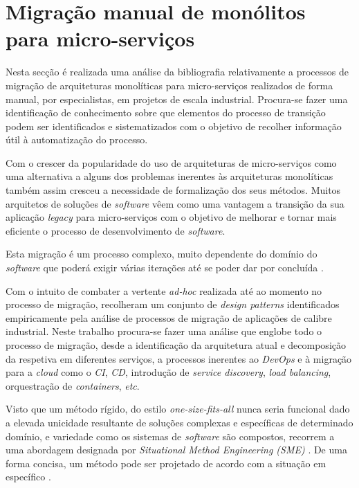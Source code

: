 \section{Migração manual de monólitos para micro-serviços}

   Nesta secção é realizada uma análise da bibliografia relativamente a processos de migração de arquiteturas monolíticas para micro-serviços realizados de forma manual, por especialistas, em projetos de escala industrial. Procura-se fazer uma identificação de conhecimento sobre que elementos do processo de transição podem ser identificados e sistematizados com o objetivo de recolher informação útil à automatização do processo.
    
    Com o crescer da popularidade do uso de arquiteturas de micro-serviços como uma alternativa a alguns dos problemas inerentes às arquiteturas monolíticas também assim cresceu a necessidade de formalização dos seus métodos. Muitos arquitetos de soluções de \textit{software} vêem como uma vantagem a transição da sua aplicação \textit{legacy} para micro-serviços com o objetivo de melhorar e tornar mais eficiente o processo de desenvolvimento de \textit{software}. 
    
    Esta migração é um processo complexo, muito dependente do domínio do \textit{software} que poderá exigir várias iterações até se poder dar por concluída \citep{dehghani18_break_monolith_into_microservices}.
    
    
    
    Com o intuito de combater a vertente \textit{ad-hoc} realizada até ao momento no processo de migração, \cite{balalaie18_ms_migration_patterns} recolheram um conjunto de \textit{design patterns} identificados empiricamente pela análise de processos de migração de aplicações de calibre industrial. Neste trabalho procura-se fazer uma análise que englobe todo o processo de migração, desde a identificação da arquitetura atual e decomposição da respetiva em diferentes serviços, a processos inerentes ao \textit{DevOps} e à migração para a \textit{cloud} como o \textit{CI}, \textit{CD}, introdução de \textit{service discovery}, \textit{load balancing}, orquestração de \textit{containers}, \textit{etc}.
    
    Visto que um método rígido, do estilo \textit{one-size-fits-all} nunca seria funcional dado a elevada unicidade resultante de soluções complexas e específicas de determinado domínio, e variedade como os sistemas de \textit{software} são compostos, \cite{balalaie18_ms_migration_patterns} recorrem a uma abordagem designada por \textit{Situational Method Engineering (SME)} \citep{situational_method_engineering}. De uma forma concisa, um método pode ser projetado de acordo com a situação em específico \citep{balalaie18_ms_migration_patterns}.
    

